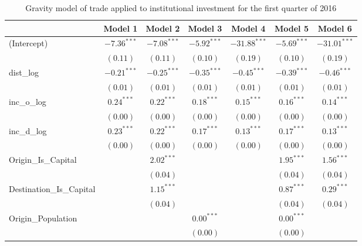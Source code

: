 \begin{table}
	\small
	\caption[Gravity Model of Trade for Q1 2016]{Gravity model of trade applied to institutional investment for the first quarter of 2016}
	\begin{center}
		\begin{tabular}{l c c c c c c }
			\hline
			& Model 1 & Model 2 & Model 3 & Model 4 & Model 5 & Model 6 \\
			\hline
			(Intercept)                  & $-7.36^{***}$ & $-7.08^{***}$ & $-5.92^{***}$ & $-31.88^{***}$ & $-5.69^{***}$ & $-31.01^{***}$ \\
			& $(0.11)$      & $(0.11)$      & $(0.10)$      & $(0.19)$       & $(0.10)$      & $(0.19)$       \\
			dist\_log                    & $-0.21^{***}$ & $-0.25^{***}$ & $-0.35^{***}$ & $-0.45^{***}$  & $-0.39^{***}$ & $-0.46^{***}$  \\
			& $(0.01)$      & $(0.01)$      & $(0.01)$      & $(0.01)$       & $(0.01)$      & $(0.01)$       \\
			inc\_o\_log                  & $0.24^{***}$  & $0.22^{***}$  & $0.18^{***}$  & $0.15^{***}$   & $0.16^{***}$  & $0.14^{***}$   \\
			& $(0.00)$      & $(0.00)$      & $(0.00)$      & $(0.00)$       & $(0.00)$      & $(0.00)$       \\
			inc\_d\_log                  & $0.23^{***}$  & $0.22^{***}$  & $0.17^{***}$  & $0.13^{***}$   & $0.17^{***}$  & $0.13^{***}$   \\
			& $(0.00)$      & $(0.00)$      & $(0.00)$      & $(0.00)$       & $(0.00)$      & $(0.00)$       \\
			Origin\_Is\_Capital          &               & $2.02^{***}$  &               &                & $1.95^{***}$  & $1.56^{***}$   \\
			&               & $(0.04)$      &               &                & $(0.04)$      & $(0.04)$       \\
			Destination\_Is\_Capital     &               & $1.15^{***}$  &               &                & $0.87^{***}$  & $0.29^{***}$   \\
			&               & $(0.04)$      &               &                & $(0.04)$      & $(0.04)$       \\
			Origin\_Population           &               &               & $0.00^{***}$  &                & $0.00^{***}$  &                \\
			&               &               & $(0.00)$      &                & $(0.00)$      &                \\

\end{tabular}
\end{center}
\end{table}
